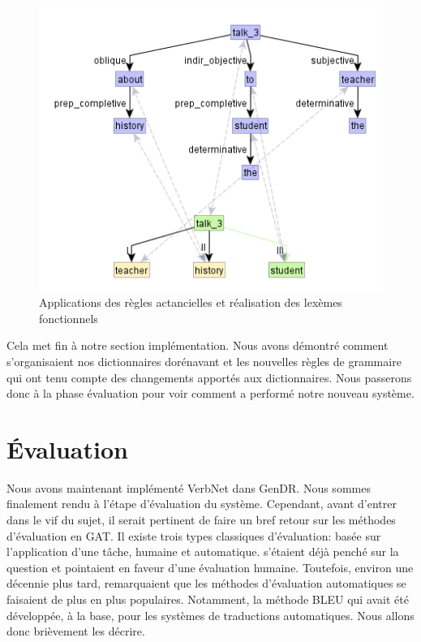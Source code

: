 \begin{figure}[htb]
	\centering
	\includegraphics[width=1\textwidth, trim = {0cm 0cm 0cm 0cm},clip]{ch6/figs/ssynt.png}
	\caption{Applications des règles actancielles et réalisation des lexèmes fonctionnels}
	\label{deroulement4}
\end{figure}

Cela met fin à notre section implémentation. Nous avons démontré comment s'organisaient nos dictionnaires dorénavant et les nouvelles règles de grammaire qui ont tenu compte des changements apportés aux dictionnaires. Nous passerons donc à la phase évaluation pour voir comment a performé notre nouveau système.

\section{Évaluation}
Nous avons maintenant implémenté VerbNet dans GenDR. Nous sommes finalement rendu à l'étape d'évaluation du système. Cependant, avant d'entrer dans le vif du sujet, il serait pertinent de faire un bref retour sur les méthodes d'évaluation en \ac{GAT}. Il existe trois types classiques d'évaluation: basée sur l'application d'une tâche, humaine et automatique. \cite{ReiterBuildingNaturalLanguage2000} s'étaient déjà penché sur la question et pointaient en faveur d'une évaluation humaine. Toutefois, environ une décennie plus tard,  remarquaient que les méthodes d'évaluation automatiques se faisaient de plus en plus populaires. Notamment, la méthode BLEU qui avait été développée, à la base, pour les systèmes de traductions automatiques. Nous allons donc brièvement les décrire.

